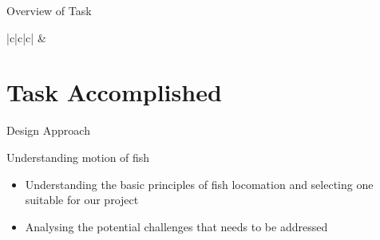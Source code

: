 \documentclass[10pt, a4paper]{beamer}
\begin{document}
\begin{frame}{Overview of Task}
\begin{table}[h]
\begin{tabular}{|c|c|c|}
 &  \\
\hline

\end{tabular}
\end{table}

\end{frame}

\section{Task Accomplished}

\begin{frame}
	\centering \huge{Design Approach}\\
\end{frame}

\begin{frame}{Understanding motion of fish}
	\begin{itemize}
    
		\item Understanding the basic principles of fish locomation and selecting one suitable for our project
         \item Analysing the potential challenges that needs to be addressed
         \end{itemize}
 
\centering
{}
\end{frame}
\end{document}
